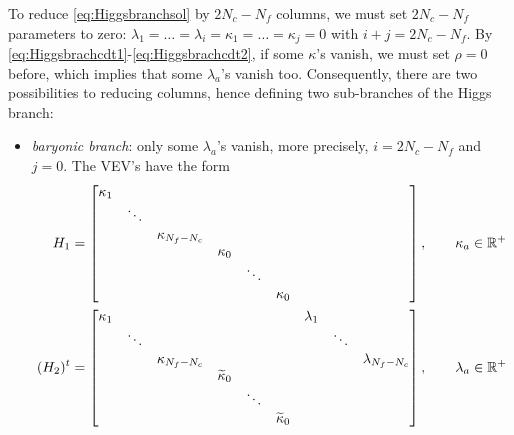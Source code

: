 \begin{itemize}
                To reduce \eqref{eq:Higgsbranchsol} by $2N_c-N_f$ columns, we must set $2N_c-N_f$ parameters to zero: $\lambda_1=\dots=\lambda_i=\kappa_1=\dots=\kappa_j=0$ with $i+j=2N_c-N_f$. By \eqref{eq:Higgsbrachcdt1}-\eqref{eq:Higgsbrachcdt2}, if some $\kappa$'s vanish, we must set $\rho=0$ before, which implies that some $\lambda_a$'s vanish too. Consequently, there are two possibilities to reducing columns, hence defining two sub-branches of the Higgs branch:
                \begin{itemize}[label=$\triangleright$]
                    \item \emph{baryonic branch}: only some $\lambda_a$'s vanish, more precisely, $i=2N_c-N_f$ and $j=0$. The VEV's have the form
                    \begin{align}
                        \begin{split}
                        H_1 &= 
                        \begin{bmatrix}
                            \kappa_1 & & & & & & \phantom{\lambda_1} & & \\
                            & \ddots & & & & & & \phantom{\ddots} & \\
                            & & \kappa_{N_f-N_c} & & & & & & \phantom{\lambda_{N_f-N_c}} \\
                            & & & \kappa_0 & & & & & \\
                            & & & & \ddots & & & & \\
                            & & & & & \kappa_0 & & &
                        \end{bmatrix},\qquad\kappa_a\in\R^+\\
                        (H_2)^t &= 
                        \begin{bmatrix}
                            \kappa_1 & & & & & & \lambda_1 & & \\
                            & \ddots & & & & & & \ddots & \\
                            & & \kappa_{N_f-N_c} & & & & & & \lambda_{N_f-N_c} \\
                            & & & \tilde{\kappa}_0 & & & & & \\
                            & & & & \ddots & & & & \\
                            & & & & & \tilde{\kappa}_0 & & &
                        \end{bmatrix},\qquad\lambda_a\in\R^+\\

\end{split}
\end{align}
\end{itemize}
\end{itemize}

